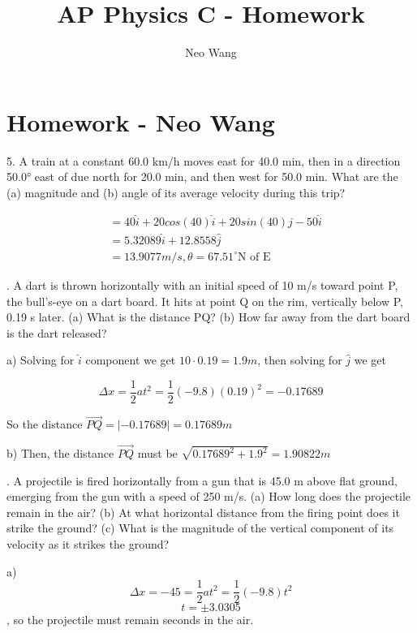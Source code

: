 \documentclass{scrreprt} %
\title{AP Physics C - Homework}
\author{Neo Wang}
\begin{document}
\section{Homework - Neo Wang}

5. A train at a constant 60.0 km/h moves east for 40.0 min,
then  in  a  direction  50.0° east  of  due  north  for  20.0 min, and  then
west for 50.0 min. What are the (a) magnitude and (b) angle of its
average velocity during this trip?

\begin{align*}
	&= 40\hat{i} + 20cos(40)\hat{i} + 20sin(40)\hat{j} - 50 \hat{i} \\
	&= 5.32089\hat{i} + 12.8558\hat{j} \\
	&= \boxed{13.9077 m/s, \theta = 67.51^\circ \textrm{N of E}}
\end{align*}


. A dart is thrown horizontally with an initial speed of 
10 m/s  toward  point  P, the  bull’s-eye  on  a  dart  board. It  hits  at
point Q on the rim, vertically below P, 0.19 s later. (a) What is the
distance PQ?  (b)  How  far  away  from  the  dart  board  is  the  dart
released? \newline

a) Solving for $\hat{i}$ component we get $10\cdot 0.19 = 1.9 m$, then solving
for $\hat{j}$ we get

$$\Delta x = \frac{1}{2}at^2 = \frac{1}{2}(-9.8)(0.19)^2=-0.17689$$

So the distance $\vec{PQ} = |-0.17689| = \boxed{0.17689 m}$

b) Then, the distance $\vec{PQ}$ must be $\sqrt{0.17689^2 + 1.9^2} = \boxed{1.90822 m}$\newline

. A projectile is fired horizontally from a gun that is 
45.0 m above flat ground, emerging from the gun with a speed of
250 m/s. (a) How long does the projectile remain in the air? (b) At
what  horizontal  distance  from  the  firing  point  does  it  strike  the
ground? (c) What is the magnitude of the vertical component of its
velocity as it strikes the ground? \newline

a) $$\Delta x = -45 = \frac{1}{2}at^2 = \frac{1}{2}(-9.8)t^2$$
$$t = \pm 3.0305$$, so the projectile must remain  seconds in the air.
\end{document}
